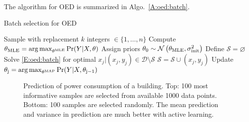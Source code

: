 The algorithm for OED is summarized in Algo.~\ref{A:oed:batch}.

\begin{algorithm}[!tb]
	\caption{Batch selection for OED}
	\label{A:oed:batch}
	\begin{algorithmic}[1]
		\State Sample with replacement \(k\) integers \( \in \{1,\dots,n\} \)
		\State Compute \( \theta_{\mathrm{MLE}} = \operatorname*{arg\,max}_{\theta^{\mathrm{MLE}}} \Pr(Y \vert X, \theta)\)
		\State Assign priors \(\theta_{\mathrm{0}} \sim \operatorname*{\mathcal{N}}\left(\theta_{\mathrm{MLE}}, \sigma^2_{\mathrm{init}}\right)\)
		\EndProcedure
		\State Define \(\mathcal{S} = \varnothing\)
		\State Solve \eqref{E:oed:batch} for optimal \({x_{j} \vert (x_j,y_j) \in \mathcal{D} \setminus \mathcal{S}} \)
		\State \(\mathcal{S} = \mathcal{S} \cup (x_j,y_j) \)
		\State Update \( \theta_{\mathrm{j}} = \operatorname*{arg\,max}_{\theta^{\mathrm{MAP}}} \Pr(Y \vert X, \theta_{\mathrm{j-1}})\)
		\EndWhile
		\EndProcedure
	\end{algorithmic}
\end{algorithm}

\begin{figure}[!tb]
	\centering
	\setlength{}
	\setlength{}	
	
	\caption{Prediction of power consumption of a building. Top: 100 most informative samples are selected from available 1000 data points. Bottom: 100 samples are selected randomly. The mean prediction and variance in prediction are much better with active learning.}
	\captionsetup{justification=centering}
	\label{F:batch-acc}
\end{figure}
